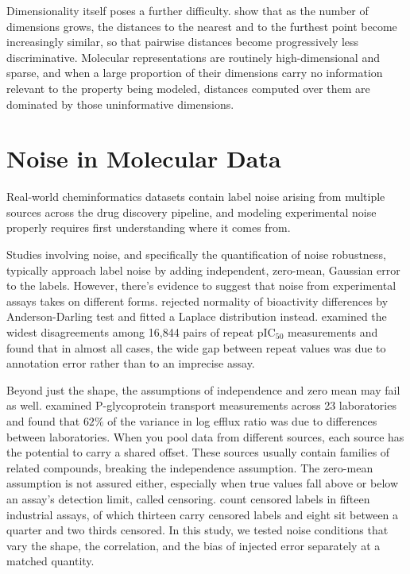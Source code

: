 Dimensionality itself poses a further difficulty. \citet{Aggarwal2001} show that as the number of dimensions grows, the distances to the nearest and to the furthest
point become increasingly similar, so that pairwise distances become progressively less discriminative. Molecular representations are routinely high-dimensional and sparse, and when a
large proportion of their dimensions carry no information relevant to the property being modeled, distances computed over them are dominated by those uninformative dimensions.



\section{Noise in Molecular Data}

Real-world cheminformatics datasets contain label noise arising from multiple sources across the drug discovery pipeline, and modeling experimental noise properly requires first understanding where it comes from.

Studies involving noise, and specifically the quantification of noise robustness, typically approach label noise by adding independent, zero-mean, Gaussian error to the labels. However, there's evidence to suggest that noise from experimental assays takes on different forms. \citet{Kruger2012} rejected normality of bioactivity differences by Anderson-Darling test and fitted a Laplace distribution instead. \citet{Kalliokoski2013} examined the widest disagreements among 16,844 pairs of repeat pIC$_{50}$ measurements and found that in almost all cases, the wide gap between repeat values was due to annotation error rather than to an imprecise assay.

Beyond just the shape, the assumptions of independence and zero mean may fail as well. \citet{Bentz2013} examined P-glycoprotein transport measurements across 23 laboratories and found that $62\%$ of the variance in log efflux ratio was due to differences between laboratories. When you pool data from different sources, each source has the potential to carry a shared offset. These sources usually contain families of related compounds, breaking the independence assumption. The zero-mean assumption is not assured either, especially when true values fall above or below an assay's detection limit, called censoring. \citet{Svensson2025} count censored labels in fifteen industrial assays, of which thirteen carry censored labels and eight sit between a quarter and two thirds censored. In this study, we tested noise conditions that vary the shape, the correlation, and the bias of injected error separately at a matched quantity.  

